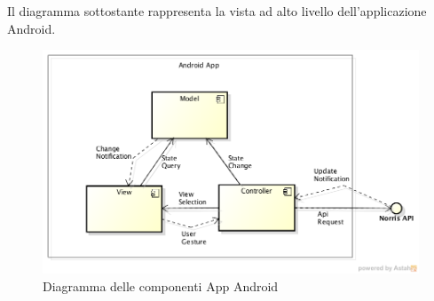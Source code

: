     Il diagramma sottostante rappresenta la vista ad alto livello dell'applicazione Android.
   
    \begin{figure}[H]\centering
        \includegraphics[width=\textwidth]{SpecificaTecnica/Pics/AndroidAppComponentDiagramLevel0.png}
        \caption{Diagramma delle componenti App Android}
    \end{figure}

